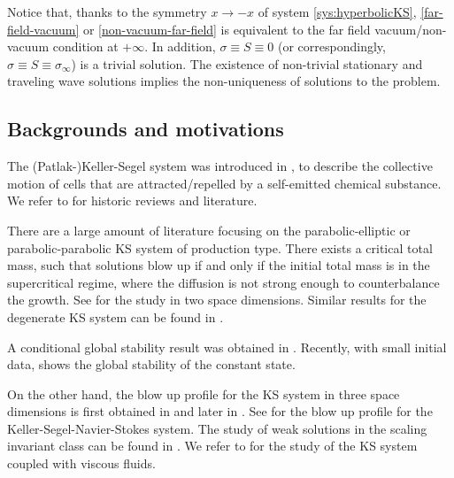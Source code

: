 \documentclass[12pt]{article}
\theoremstyle{definition}
\theoremstyle{remark}
\numberwithin{equation}{section}
\begin{document}
Notice that, thanks to the symmetry $ x \rightarrow -x $ of system \eqref{sys:hyperbolicKS}, \eqref{far-field-vacuum} or \eqref{non-vacuum-far-field} is equivalent to the far field vacuum/non-vacuum condition at $ + \infty $. In addition, $ \sigma \equiv S \equiv 0 $ (or correspondingly, $ \sigma \equiv S \equiv \sigma_\infty $) is a trivial solution. The existence of non-trivial stationary and traveling wave solutions implies the non-uniqueness of solutions to the problem. 

\subsection{Backgrounds and motivations}

The (Patlak-)Keller-Segel system was introduced in \cite{patlakRandomWalkPersistence1953,kellerInitiationSlimeMold1970}, to describe the collective motion of cells that are attracted/repelled by a self-emitted chemical substance. We refer to \cite{horstmann1970PresentKellerSegel2003,hillenUsersGuidePDE2009} for historic reviews and literature. 

There are a large amount of literature focusing on the parabolic-elliptic or parabolic-parabolic KS system of production type. There exists a critical total mass, such that solutions blow up if and only if the initial total mass is in the supercritical regime, where the diffusion is not strong enough to counterbalance the growth. See \cite{eganafernandezUniquenessLongTime2016,blanchetTwodimensionalKellerSegelModel2006,blanchetInfiniteTimeAggregation2008} for the study in two space dimensions. Similar results for the degenerate KS system can be found in \cite{sugiyamaGlobalExistenceSubcritical2006,sugiyamaApplicationBestConstant2007,blanchetCriticalMassPatlak2009}.

A conditional global stability result was obtained in 
\cite{feireislConvergenceEquilibriaKeller2007}. Recently, with small initial data, \cite{hsiehLongtimeDynamicsClassical2024} shows the global stability of the constant state. 

On the other hand, the blow up profile for the KS system in three space dimensions is first obtained in
\cite{soupletBlowupProfilesParabolic2019} and later in
\cite{baiBlowupProfileKeller2025}. See  \cite{liuFiniteTimeBlowup2025} for the blow up profile for the Keller-Segel-Navier-Stokes system. The study of weak solutions in the scaling invariant class can be found in \cite{kozonoExistenceUniquenessTheorem2012}. We refer to 
\cite{hieberStrongSolutionsKellerSegelNavierStokes2025,naGlobalWellposednessTwodimensional2024, chaeExistenceSmoothSolutions2012,winklerGlobalLargeDataSolutions2012,winklerStabilizationTwodimensionalChemotaxisNavierStokes2014,ahnStabilityInstabilityFully2026,tanTimePeriodicStrong2021} for the study of the KS system coupled with viscous fluids. 
\end{document}
